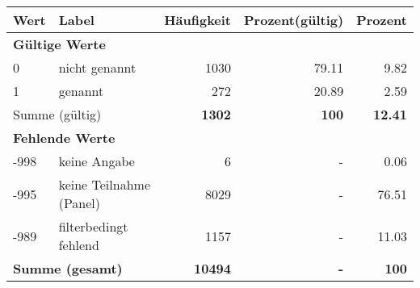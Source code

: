      \begin{longtable}{lXrrr}
     \toprule
     \textbf{Wert} & \textbf{Label} & \textbf{Häufigkeit} & \textbf{Prozent(gültig)} & \textbf{Prozent} \\
     \endhead
     \midrule
     \multicolumn{5}{l}{\textbf{Gültige Werte}}\\

     0 &
     \multicolumn{1}{X}{ nicht genannt   } &


       \num{1030} &
       \num[round-mode=places,round-precision=2]{79.11} &
         \num[round-mode=places,round-precision=2]{9.82} \\

     1 &
     \multicolumn{1}{X}{ genannt   } &


       \num{272} &
       \num[round-mode=places,round-precision=2]{20.89} &
         \num[round-mode=places,round-precision=2]{2.59} \\
     \midrule
     \multicolumn{2}{l}{Summe (gültig)} &
       \textbf{\num{1302}} &
     \textbf{\num{100}} &
       \textbf{\num[round-mode=places,round-precision=2]{12.41}} \\
     \multicolumn{5}{l}{\textbf{Fehlende Werte}}\\
       -998 &
       keine Angabe &
         \num{6} &
        - &
         \num[round-mode=places,round-precision=2]{0.06} \\
       -995 &
       keine Teilnahme (Panel) &
         \num{8029} &
        - &
         \num[round-mode=places,round-precision=2]{76.51} \\
       -989 &
       filterbedingt fehlend &
         \num{1157} &
        - &
         \num[round-mode=places,round-precision=2]{11.03} \\
     \midrule
     \multicolumn{2}{l}{\textbf{Summe (gesamt)}} &
          \textbf{\num{10494}} &
        \textbf{-} &
        \textbf{\num{100}} \\
     \bottomrule
     \end{longtable}
     
